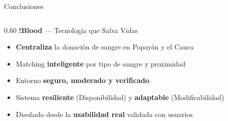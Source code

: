 \documentclass[aspectratio=169, 12pt]{beamer}
\newcommand{\greytext}[1]{{\color{warmgray}#1}}
\begin{document}
{
\begin{frame}[plain]{Conclusiones}

  \vspace{6pt}
  \begin{columns}[T]
    \begin{column}{0.60\textwidth}
      {\large\bfseries\color{bloodlt}!Blood}\greytext{ — Tecnología que Salva Vidas}
      \vspace{8pt}

      \begin{itemize}\setlength\itemsep{7pt}
        \item[\color{bloodred}\faDroplet]
          \textbf{Centraliza} la donación de sangre en Popayán y el Cauca
        \item[\color{bloodred}\faMapMarkerAlt]
          Matching \textbf{inteligente} por tipo de sangre y proximidad
        \item[\color{bloodred}\faShieldAlt]
          Entorno \textbf{seguro, moderado y verificado}
        \item[\color{bloodred}\faRecycle]
          Sistema \textbf{resiliente} (Disponibilidad) y \textbf{adaptable} (Modificabilidad)
        \item[\color{bloodred}\faStar]
          Diseñado desde la \textbf{usabilidad real} validada con usuarios
      \end{itemize}


\end{column}
\end{columns}
\end{frame}}
\end{document}
